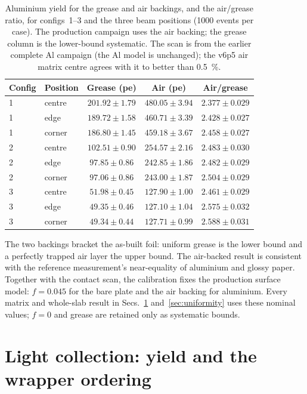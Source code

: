 \documentclass[11pt,a4paper]{article}
\begin{document}
\begin{table}[H]
\centering
\caption{Aluminium yield for the grease and air backings, and the air/grease
ratio, for configs~1--3 and the three beam positions (\num{1000} events per
case). The production campaign uses the air backing; the grease column is the
lower-bound systematic. The scan is from the earlier complete Al campaign (the
Al model is unchanged); the v6p5 air matrix centre agrees with it to better than
\SI{0.5}{\percent}.}
\label{tab:albacking}
\small
\begin{tabular}{@{}llccc@{}}
\toprule
Config & Position & Grease (pe) & Air (pe) & Air/grease \\
\midrule
1 & centre & $201.92 \pm 1.79$ & $480.05 \pm 3.94$ & $2.377 \pm 0.029$ \\
1 & edge   & $189.72 \pm 1.58$ & $460.71 \pm 3.39$ & $2.428 \pm 0.027$ \\
1 & corner & $186.80 \pm 1.45$ & $459.18 \pm 3.67$ & $2.458 \pm 0.027$ \\
2 & centre & $102.51 \pm 0.90$ & $254.57 \pm 2.16$ & $2.483 \pm 0.030$ \\
2 & edge   & $97.85 \pm 0.86$  & $242.85 \pm 1.86$ & $2.482 \pm 0.029$ \\
2 & corner & $97.06 \pm 0.86$  & $243.00 \pm 1.87$ & $2.504 \pm 0.029$ \\
3 & centre & $51.98 \pm 0.45$  & $127.90 \pm 1.00$ & $2.461 \pm 0.029$ \\
3 & edge   & $49.35 \pm 0.46$  & $127.10 \pm 1.04$ & $2.575 \pm 0.032$ \\
3 & corner & $49.34 \pm 0.44$  & $127.71 \pm 0.99$ & $2.588 \pm 0.031$ \\
\bottomrule
\end{tabular}
\end{table}

The two backings bracket the as-built foil: uniform grease is the lower bound
and a perfectly trapped air layer the upper bound. The air-backed result is
consistent with the reference measurement's near-equality of aluminium and
glossy paper. Together with the contact scan, the calibration fixes the
production surface model: $f=\num{0.045}$ for the bare plate and the air backing
for aluminium. Every matrix and whole-slab result in
Secs.~\ref{sec:yield} and~\ref{sec:uniformity} uses these nominal values; $f=0$ and
grease are retained only as systematic bounds.

\section{Light collection: yield and the wrapper ordering}
\label{sec:yield}
\end{document}
